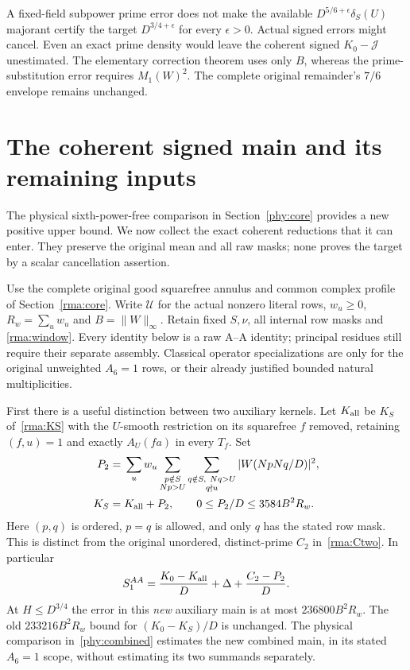 \documentclass[11pt]{article}
\theoremstyle{definition}\newtheorem{definition}[theorem]{Definition}
\theoremstyle{remark}\newtheorem{remark}[theorem]{Remark}
\begin{document}
A fixed-field subpower prime error does not make the available
$D^{5/6+\epsilon}\delta_S(U)$ majorant certify the target
$D^{3/4+\epsilon}$ for every $\epsilon>0$. Actual signed errors might
cancel. Even an exact prime density would leave the coherent signed
$K_0-\mathcal J$ unestimated. The elementary correction theorem uses
only $B$, whereas the prime-substitution error requires $M_1(W)^2$.
The complete original remainder's $7/6$ envelope remains unchanged.

\section{The coherent signed main and its remaining inputs}\label{cmr:core}
The physical sixth-power-free comparison in Section~\ref{phy:core}
provides a new positive upper bound. We now collect the exact coherent
reductions that it can enter. They preserve the original mean and all
raw masks; none proves the target by a scalar cancellation assertion.

Use the complete original good squarefree annulus and common complex
profile of Section~\ref{rma:core}. Write $\mathcal U$ for the actual
nonzero literal rows, $w_u\ge0$, $R_w=\sum_u w_u$ and
$B=\|W\|_\infty$. Retain fixed $S,\nu$, all internal row masks and
\eqref{rma:window}. Every identity below is a raw A--A identity;
principal residues still require their separate assembly. Classical
operator specializations are only for the original unweighted
$A_6=1$ rows, or their already justified bounded natural multiplicities.

First there is a useful distinction between two auxiliary kernels.
Let $K_{\rm all}$ be $K_S$ of~\eqref{rma:KS} with the $U$-smooth
restriction on its squarefree $f$ removed, retaining $(f,u)=1$ and
exactly $A_U(fa)$ in every $T_f$. Set
\begin{equation}\label{cmr:Ptwo}
 \begin{split}
 P_2={}&\sum_u w_u\sum_{\substack{p\notin S\\Np>U}}
       \sum_{\substack{q\notin S,\ Nq>U\\q\nmid u}}
          |W(NpNq/D)|^2,\\
 K_S={}&K_{\rm all}+P_2,\qquad
 0\le P_2/D\le3584B^2R_w.
 \end{split}
\end{equation}
Here $(p,q)$ is ordered, $p=q$ is allowed, and only $q$ has the
stated row mask. This is distinct from the original unordered,
distinct-prime $C_2$ in~\eqref{rma:Ctwo}. In particular
\begin{equation}\label{cmr:auxexact}
 S_1^{AA}=\frac{K_0-K_{\rm all}}D+\Delta+\frac{C_2-P_2}D.
\end{equation}
At $H\le D^{3/4}$ the error in this \emph{new} auxiliary main is
at most $236800B^2R_w$. The old $233216B^2R_w$ bound for
$(K_0-K_S)/D$ is unchanged. The physical comparison
in~\eqref{phy:combined} estimates the new combined main, in its stated
$A_6=1$ scope, without estimating its two summands separately.
\end{document}
